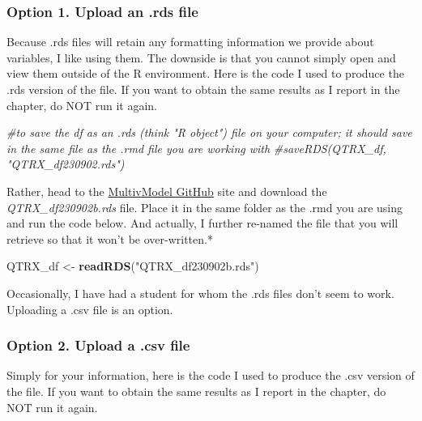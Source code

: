 \documentclass[
  11pt,
]{book}
\newenvironment{Shaded}{\begin{snugshade}}{\end{snugshade}}
\newcommand{\CommentTok}[1]{\textcolor[rgb]{0.37,0.37,0.37}{\textit{#1}}}
\newcommand{\FunctionTok}[1]{\textcolor[rgb]{0.27,0.27,0.27}{\textbf{#1}}}
\newcommand{\NormalTok}[1]{#1}
\newcommand{\OtherTok}[1]{\textcolor[rgb]{0.37,0.37,0.37}{#1}}
\newcommand{\StringTok}[1]{\textcolor[rgb]{0.5,0.5,0.5}{#1}}
\begin{document}
\hypertarget{option-1.-upload-an-.rds-file}{%
\subsubsection{Option 1. Upload an .rds file}\label{option-1.-upload-an-.rds-file}}

Because .rds files will retain any formatting information we provide about variables, I like using them. The downside is that you cannot simply open and view them outside of the R environment. Here is the code I used to produce the .rds version of the file. If you want to obtain the same results as I report in the chapter, do NOT run it again.

\begin{Shaded}
\begin{Highlighting}[]
\CommentTok{\#to save the df as an .rds (think "R object") file on your computer; it should save in the same file as the .rmd file you are working with}
\CommentTok{\#saveRDS(QTRX\_df, "QTRX\_df230902.rds")}
\end{Highlighting}
\end{Shaded}

Rather, head to the \href{https://github.com/lhbikos/ReC_MultivModel}{MultivModel GitHub} site and download the \emph{QTRX\_df230902b.rds} file. Place it in the same folder as the .rmd you are using and run the code below. And actually, I further re-named the file that you will retrieve so that it won't be over-written.*

\begin{Shaded}
\begin{Highlighting}[]
\NormalTok{QTRX\_df }\OtherTok{\textless{}{-}} \FunctionTok{readRDS}\NormalTok{(}\StringTok{"QTRX\_df230902b.rds"}\NormalTok{)}
\end{Highlighting}
\end{Shaded}

Occasionally, I have had a student for whom the .rds files don't seem to work. Uploading a .csv file is an option.

\hypertarget{option-2.-upload-a-.csv-file}{%
\subsubsection{Option 2. Upload a .csv file}\label{option-2.-upload-a-.csv-file}}

Simply for your information, here is the code I used to produce the .csv version of the file. If you want to obtain the same results as I report in the chapter, do NOT run it again.
\end{document}
